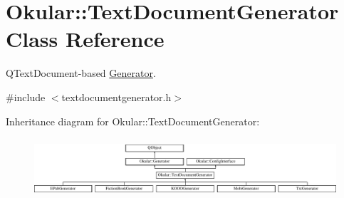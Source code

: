 \hypertarget{classOkular_1_1TextDocumentGenerator}{\section{Okular\+:\+:Text\+Document\+Generator Class Reference}
\label{classOkular_1_1TextDocumentGenerator}
}


Q\+Text\+Document-\/based \hyperlink{classOkular_1_1Generator}{Generator}.  




{\ttfamily \#include $<$textdocumentgenerator.\+h$>$}

Inheritance diagram for Okular\+:\+:Text\+Document\+Generator\+:\begin{figure}[H]
\begin{center}
\leavevmode
\includegraphics[height=2.240000cm]{classOkular_1_1TextDocumentGenerator}
\end{center}
\end{figure}

